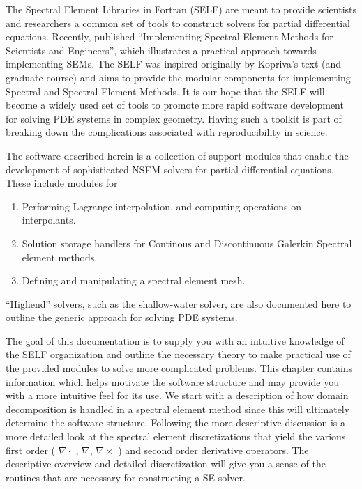 \documentclass[12pt]{softwaremanual}
\begin{document}
 The Spectral Element Libraries in Fortran (SELF) are meant to provide scientists and researchers a common set of tools to construct solvers for partial differential equations. Recently, \citet{Kopriva2009} published ``Implementing Spectral Element Methods for Scientists and Engineers'', which illustrates a practical approach towards implementing SEMs. The SELF was inspired originally by Kopriva's text (and graduate course) and aims to provide the modular components for implementing Spectral and Spectral Element Methods. It is our hope that the SELF will become a widely used set of tools to promote more rapid software development for solving PDE systems in complex geometry. Having such a toolkit is part of breaking down the complications associated with reproducibility in science.
 
 The software described herein is a collection of support modules that enable the development of sophisticated NSEM solvers for partial differential equations. These include modules for 
 \begin{enumerate}
 \item Performing Lagrange interpolation, and computing operations on interpolants.
 \item Solution storage handlers for Continous and Discontinuous Galerkin Spectral element methods.
 \item Defining and manipulating a spectral element mesh.
 \end{enumerate}
 ``Highend'' solvers, such as the shallow-water solver, are also documented here to outline the generic approach for solving PDE systems. 
 
 The goal of this documentation is to supply you with an intuitive knowledge of the SELF organization and outline the necessary theory to make practical use of the provided modules to solve more complicated problems. This chapter contains information which helps motivate the software structure and may provide you with a more intuitive feel for its use. We start with a description of how domain decomposition is handled in a spectral element method since this will ultimately determine the software structure. Following the more descriptive discussion is a more detailed look at the spectral element discretizations that yield the various first order ( $\nabla \cdot$ , $\nabla$, $\nabla \times $ ) and second order derivative operators. The descriptive overview and detailed discretization will give you a sense of the routines that are necessary for constructing a SE solver.
 
\end{document}
